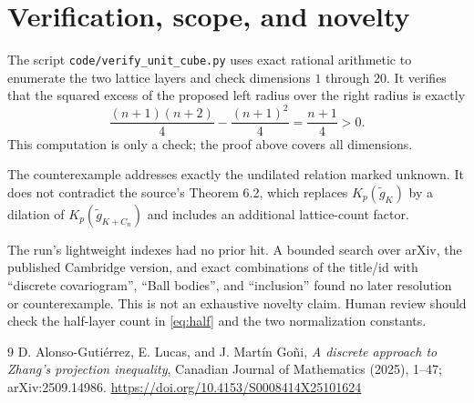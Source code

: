 \documentclass[11pt]{article}
\begin{document}
\section{Verification, scope, and novelty}

The script \texttt{code/verify\_unit\_cube.py} uses exact rational arithmetic
to enumerate the two lattice layers and check dimensions $1$ through $20$.
It verifies that the squared excess of the proposed left radius over the
right radius is exactly
\[
 \frac{(n+1)(n+2)}4-\frac{(n+1)^2}4=\frac{n+1}{4}>0.
\]
This computation is only a check; the proof above covers all dimensions.

The counterexample addresses exactly the undilated relation marked unknown.
It does not contradict the source's Theorem 6.2, which replaces
$K_p(\widetilde g_K)$ by a dilation of
$K_p(\widetilde g_{K+C_n})$ and includes an additional lattice-count factor.

The run's lightweight indexes had no prior hit.  A bounded search over arXiv,
the published Cambridge version, and exact combinations of the title/id with
``discrete covariogram'', ``Ball bodies'', and ``inclusion'' found no later
resolution or counterexample.  This is not an exhaustive novelty claim.
Human review should check the half-layer count in \eqref{eq:half} and the two
normalization constants.

\begin{thebibliography}{9}
D. Alonso-Guti\'errez, E. Lucas, and J. Mart\'in Go\~ni,
\emph{A discrete approach to Zhang's projection inequality},
Canadian Journal of Mathematics (2025), 1--47;
arXiv:2509.14986.
\url{https://doi.org/10.4153/S0008414X25101624}
\end{thebibliography}
\end{document}
